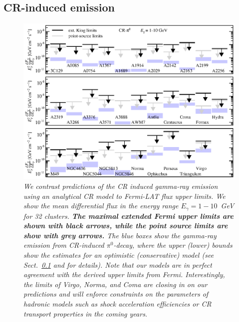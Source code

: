 \documentclass[10pt,aps,pra,reprint,amsmath,amsfonts,amssymb,showpacs,nofootinbib,floatfix]{revtex4-1}
\def\C#1{{\bf #1}}
\begin{document}
\subsection{CR-induced emission}
\label{sec:CRemission} 
\begin{figure}
\begin{minipage}{2.0\columnwidth}
  \includegraphics[width=0.99\columnwidth]{figures/Fermi.comp.CR.diff.eps}
  \caption{\it We contrast predictions of the CR induced gamma-ray
    emission using an analytical CR model \protect
    \cite{2010MNRAS.409..449P} to Fermi-LAT flux upper limits. We show
    the mean differential flux in the energy range $E_\gamma=1-10$~GeV
    for 32 clusters. \C{The maximal extended Fermi upper limits are
      shown with black arrows, while the point source limits are
      show with grey arrows.} The blue boxes show the gamma-ray emission from
    CR-induced $\pi^0$-decay, where the upper (lower) bounds show the
    estimates for an optimistic (conservative) model (see
    Sect.~\ref{sec:CRemission} and \cite{2010MNRAS.409..449P} for
    details). Note that our models are in perfect agreement with the
    derived upper limits from Fermi. Interestingly, the limits of
    Virgo, Norma, and Coma are closing in on our predictions and will
    enforce constraints on the parameters of hadronic models such as
    shock acceleration efficiencies or CR transport properties in the
    coming years.}
 \label{fig15}
\end{minipage}
\end{figure}
\end{document}
